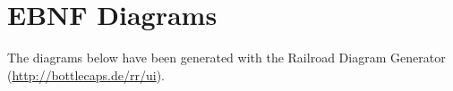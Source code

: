\section*{EBNF Diagrams}
\label{app:ebnf}

%

The diagrams below have been generated with the Railroad Diagram Generator (\url{http://bottlecaps.de/rr/ui}).

